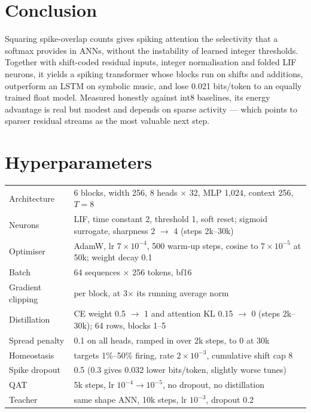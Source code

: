 \documentclass[10pt]{article}
\begin{document}
\section{Conclusion}

Squaring spike-overlap counts gives spiking attention the selectivity that a softmax provides in ANNs, without the
instability of learned integer thresholds. Together with shift-coded residual inputs, integer normalisation and
folded LIF neurons, it yields a spiking transformer whose blocks run on shifts and additions, outperform an LSTM on
symbolic music, and lose 0.021 bits/token to an equally trained float model. Measured honestly against int8
baselines, its energy advantage is real but modest and depends on sparse activity --- which points to sparser
residual streams as the most valuable next step.




\appendix
\section{Hyperparameters}
\label{app:hp}

\begin{table}[h]
\centering
\small
\begin{tabular}{ll}
\toprule
Architecture & 6 blocks, width 256, 8 heads $\times$ 32, MLP 1{,}024, context 256, $T=8$ \\
Neurons & LIF, time constant 2, threshold 1, soft reset; sigmoid surrogate, sharpness 2 $\to$ 4 (steps 2k--30k) \\
Optimiser & AdamW, lr $7\times10^{-4}$, 500 warm-up steps, cosine to $7\times10^{-5}$ at 50k; weight decay 0.1 \\
Batch & 64 sequences $\times$ 256 tokens, bf16 \\
Gradient clipping & per block, at 3$\times$ its running average norm \\
Distillation & CE weight 0.5 $\to$ 1 and attention KL 0.15 $\to$ 0 (steps 2k--30k); 64 rows, blocks 1--5 \\
Spread penalty & 0.1 on all heads, ramped in over 2k steps, to 0 at 30k \\
Homeostasis & targets 1\%--50\% firing, rate $2\times10^{-3}$, cumulative shift cap 8 \\
Spike dropout & 0.5 (0.3 gives 0.032 lower bits/token, slightly worse tunes) \\
QAT & 5k steps, lr $10^{-4} \to 10^{-5}$, no dropout, no distillation \\
Teacher & same shape ANN, 10k steps, lr $10^{-3}$, dropout 0.2 \\
\bottomrule
\end{tabular}
\end{table}
\end{document}
